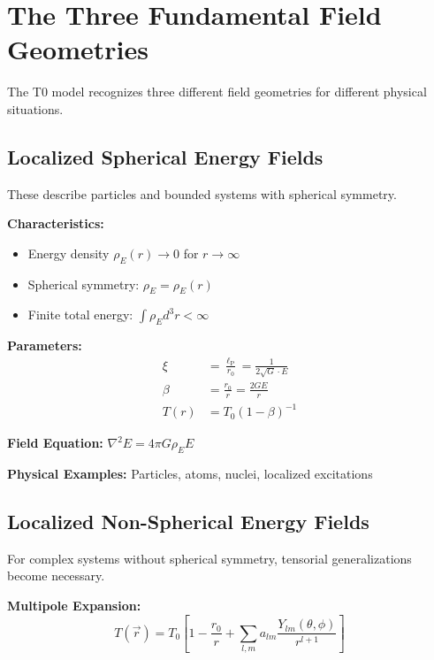 \documentclass[12pt,a4paper]{report}
\newcommand{\lP}{\ell_{\text{P}}}         %
\newcommand{\rzero}{r_0}                  %
\begin{document}
	\section{The Three Fundamental Field Geometries}
	\label{sec:three_field_geometries}
	
	The T0 model recognizes three different field geometries for different physical situations.
	
	\subsection{Localized Spherical Energy Fields}
	\label{subsec:localized_spherical}
	
	These describe particles and bounded systems with spherical symmetry.
	
	\textbf{Characteristics:}
	\begin{itemize}
		\item Energy density $\rho_E(r) \to 0$ for $r \to \infty$
		\item Spherical symmetry: $\rho_E = \rho_E(r)$
		\item Finite total energy: $\int \rho_E d^3r < \infty$
	\end{itemize}
	
	\textbf{Parameters:}
	\begin{align}
		\xi &= \frac{\lP}{\rzero} = \frac{1}{2\sqrt{G} \cdot E} \\
		\beta &= \frac{\rzero}{r} = \frac{2GE}{r} \\
		T(r) &= T_0(1 - \beta)^{-1}
	\end{align}
	
	\textbf{Field Equation:} $\nabla^2 E = 4\pi G \rho_E E$
	
	\textbf{Physical Examples:} Particles, atoms, nuclei, localized excitations
	
	\subsection{Localized Non-Spherical Energy Fields}
	\label{subsec:localized_nonsphere}
	
	For complex systems without spherical symmetry, tensorial generalizations become necessary.
	
	\textbf{Multipole Expansion:}
	\begin{equation}
		T(\vec{r}) = T_0\left[1 - \frac{\rzero}{r} + \sum_{l,m} a_{lm} \frac{Y_{lm}(\theta,\phi)}{r^{l+1}}\right]
		\label{eq:multipole_expansion}
	\end{equation}
	
\end{document}
